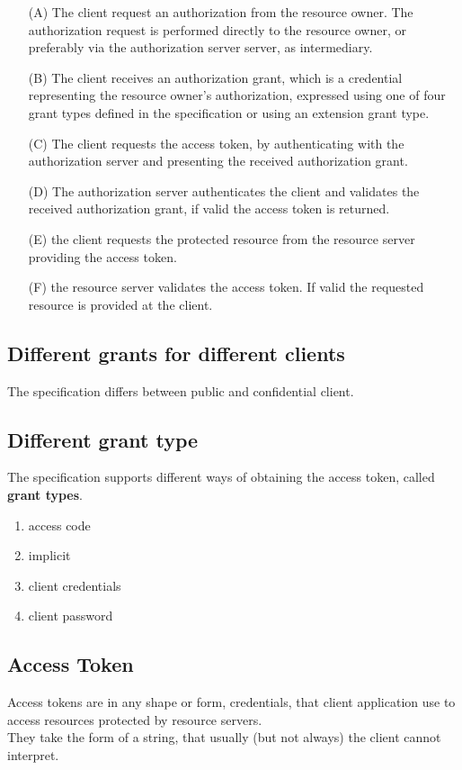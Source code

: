 \documentclass[11pt]{style}
\begin{document}
 \begin{itemize}
     \item[(A)] The client request an authorization from the resource owner.
         The authorization request is performed directly to the resource owner,
         or preferably via the authorization server server, as intermediary.
     \item[(B)] The client receives an authorization grant, which is a
         credential representing the resource owner's authorization, expressed
         using one of four grant types defined in the specification or using an
         extension grant type.
     \item[(C)] The client requests the access token, by authenticating with the
         authorization server and presenting the received authorization grant.
     \item[(D)] The authorization server authenticates the client and validates
         the received authorization grant, if valid the access token is
         returned.
     \item[(E)] the client requests the protected resource from the resource
         server providing the access token.
     \item[(F)] the resource server validates the access token. If valid the
         requested resource is provided at the client.
 \end{itemize}

\subsection{Different grants for different clients}
The specification differs between public and confidential client.

\subsection{Different grant type}
The specification supports different ways of obtaining the access token, called
\textbf{grant types}.
\begin{enumerate}
    \item access code
    \item implicit
    \item client credentials
    \item client password
\end{enumerate}

\subsection{Access Token}
Access tokens are in any shape or form, credentials, that client application use
to access resources protected by resource servers.
\\
They take the form of a string, that usually (but not always) the client cannot
interpret.
\end{document}
